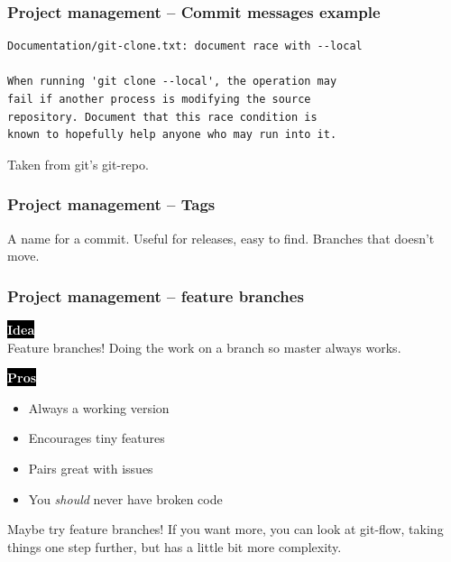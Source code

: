 \documentclass{beamer}
\newcommand{\keyword}[1]{\hspace{-1.0em}\colorbox{black}{\textcolor{white}{\textbf{#1}\vphantom{Ep}}}\vspace{0.2em}} %
\begin{document}
\begin{frame}[fragile]
  \frametitle{Project management -- Commit messages example}
  \small
  \begin{verbatim}
Documentation/git-clone.txt: document race with --local

When running 'git clone --local', the operation may
fail if another process is modifying the source
repository. Document that this race condition is
known to hopefully help anyone who may run into it.
  \end{verbatim}
  Taken from git's git-repo.
\end{frame}

\begin{frame}[fragile]
  \frametitle{Project management -- Tags}
  
  A name for a commit. Useful for releases, easy to find.
  \vspace{1em}
  Branches that doesn't move.

\end{frame}

\begin{frame}[fragile]
  \frametitle{Project management -- feature branches}

  \keyword{Idea} \\
  Feature branches! Doing the work on a branch so master always works. \\
  \vspace{1em}

  \keyword{Pros}
  \begin{itemize}[<+->]
    \item Always a working version
    \item Encourages tiny features
    \item Pairs great with issues
    \item You \emph{should} never have broken code
  \end{itemize}
  \vspace{1em}

  Maybe try feature branches! If you want more, you can look at git-flow, taking
  things one step further, but has a little bit more complexity.

\end{frame}
\end{document}
